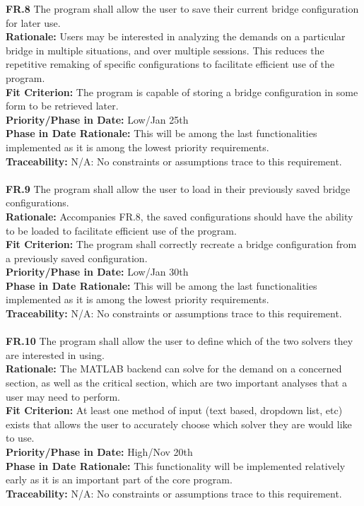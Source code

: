 \documentclass[12pt]{article}
\begin{document}
  \noindent\textbf{FR.8} The program shall allow the user to save their current bridge configuration for later use.\\
  \textbf{Rationale:} Users may be interested in analyzing the demands on a particular bridge in multiple situations, 
  and over multiple sessions. This reduces the repetitive remaking of specific configurations to facilitate efficient use of the program.\\
  \textbf{Fit Criterion:} The program is capable of storing a bridge configuration in some form to be retrieved later.\\
  \textbf{Priority/Phase in Date:} Low/Jan 25th\\
  \textbf{Phase in Date Rationale:} This will be among the last functionalities implemented as it is among the lowest priority requirements.\\
  \textbf{Traceability:} N/A: No constraints or assumptions trace to this requirement.\\\\

  \noindent\textbf{FR.9} The program shall allow the user to load in their previously saved bridge configurations.\\
  \textbf{Rationale:} Accompanies FR.8, the saved configurations should have the ability to be loaded to facilitate efficient use of the program.\\
  \textbf{Fit Criterion:} The program shall correctly recreate a bridge configuration from a previously saved configuration.\\
  \textbf{Priority/Phase in Date:} Low/Jan 30th\\
  \textbf{Phase in Date Rationale:} This will be among the last functionalities implemented as it is among the lowest priority requirements.\\
  \textbf{Traceability:} N/A: No constraints or assumptions trace to this requirement.\\\\

  \noindent\textbf{FR.10} The program shall allow the user to define which of the two solvers they are interested in using.\\
  \textbf{Rationale:} The MATLAB backend can solve for the demand on a concerned section, as well as the critical section, which are two important analyses that a user may need to perform.\\
  \textbf{Fit Criterion:} At least one method of input (text based, dropdown list, etc) exists that allows the user to accurately choose which solver they are would like to use.\\
  \textbf{Priority/Phase in Date:} High/Nov 20th\\
  \textbf{Phase in Date Rationale:} This functionality will be implemented relatively early as it is an important part of the core program.\\
  \textbf{Traceability:} N/A: No constraints or assumptions trace to this requirement.\\\\
\end{document}
